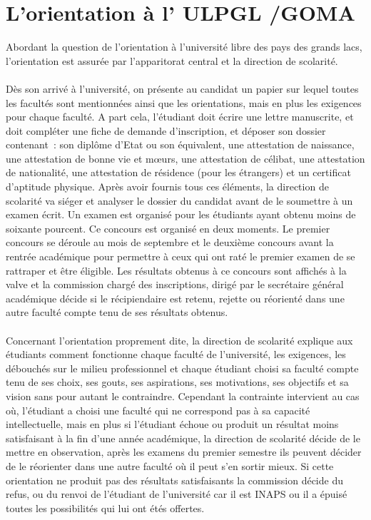 \section{L'orientation à l' \ac{ULPGL} /GOMA  \cite{OrBk6} }
Abordant la question de l’orientation à l’université libre des pays des grands lacs, l’orientation est assurée par l’apparitorat  central et la direction de scolarité. 
\paragraph{}
Dès son arrivé à l’université, on présente au candidat un papier sur lequel toutes les facultés sont mentionnées ainsi que les orientations, mais en plus les exigences pour chaque faculté. 
 A part cela, l’étudiant doit écrire une lettre manuscrite, et doit compléter une fiche de demande d’inscription, et déposer son dossier contenant : son diplôme d’Etat ou son équivalent, une attestation de naissance, une attestation de bonne vie et mœurs, une attestation de célibat, une attestation de nationalité, une attestation de résidence  (pour les étrangers) et un certificat d’aptitude physique. Après avoir fournis tous ces éléments, la direction de scolarité va siéger et analyser le dossier du candidat avant de le soumettre à un examen écrit.   
Un examen est organisé pour les étudiants ayant obtenu moins de soixante pourcent. Ce concours est organisé en deux moments. Le premier concours se déroule au mois de septembre et le deuxième concours avant la rentrée académique  pour permettre à ceux qui ont raté le premier examen de se rattraper et être éligible. Les résultats obtenus à ce concours sont affichés à la valve et la commission chargé des inscriptions, dirigé par le secrétaire général académique décide si le récipiendaire est retenu, rejette ou réorienté dans une autre faculté compte tenu de ses résultats obtenus. 
\paragraph{}
Concernant l’orientation proprement dite, la direction de scolarité explique aux étudiants comment fonctionne chaque faculté de l’université, les exigences, les débouchés sur le milieu professionnel et chaque étudiant choisi sa faculté compte tenu de ses choix, ses gouts, ses aspirations, ses motivations, ses objectifs et sa vision sans pour autant le contraindre. Cependant la contrainte intervient au cas où, l’étudiant a choisi une faculté qui ne correspond pas à sa capacité intellectuelle, mais en plus si l’étudiant échoue ou produit un résultat moins satisfaisant à la fin d’une année académique, la direction de scolarité décide de le mettre en  observation, après les examens du premier semestre ils peuvent décider de le réorienter dans une autre faculté où il peut s’en sortir mieux.  Si cette orientation ne produit pas des résultats satisfaisants la commission décide du refus, ou du renvoi de l’étudiant de l’université car il est  \ac{INAPS} ou il a épuisé toutes les possibilités qui lui ont étés offertes. 